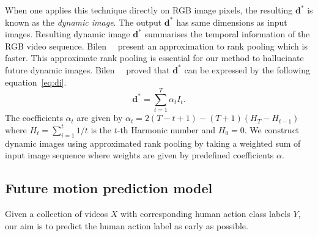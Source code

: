 When one applies this technique directly on RGB image pixels, the resulting $\mathbf{d^*}$ is known as the \emph{dynamic image}. 
The output $\mathbf{d^*}$ has same dimensions as input images.
Resulting dynamic image $\mathbf{d^*}$ summarises the temporal information of the RGB video sequence. 
Bilen~\etal~\cite{bilen2016dynamic} present an approximation to rank pooling which is faster.
This approximate rank pooling is essential for our method to hallucinate future dynamic images.
%
%
Bilen~\etal~\cite{bilen2016dynamic} proved that $\mathbf{d^*}$ can be expressed by the following equation~\ref{eq:di}.
\begin{equation}
 \mathbf{d^*} = \sum_{t=1}^T \alpha_t I_t.
 \label{eq:di}
\end{equation}
%
The coefficients $\alpha_t$ are given by
%
 $\alpha_t = 2(T - t + 1) - (T+1)(H_{T} - H_{t-1})$
%
where $H_t = \sum_{i=1}^t 1/t$  is the $t$-th Harmonic number and $H_0=0$. 
We construct dynamic images using approximated rank pooling by taking a weighted sum of input image sequence where weights are given by predefined coefficients $\alpha$.

\subsection{Future motion prediction model}
\label{sec.model}
Given a collection of videos $X$ with corresponding human action class labels $Y$, our aim is to predict the human action label as early as possible.

